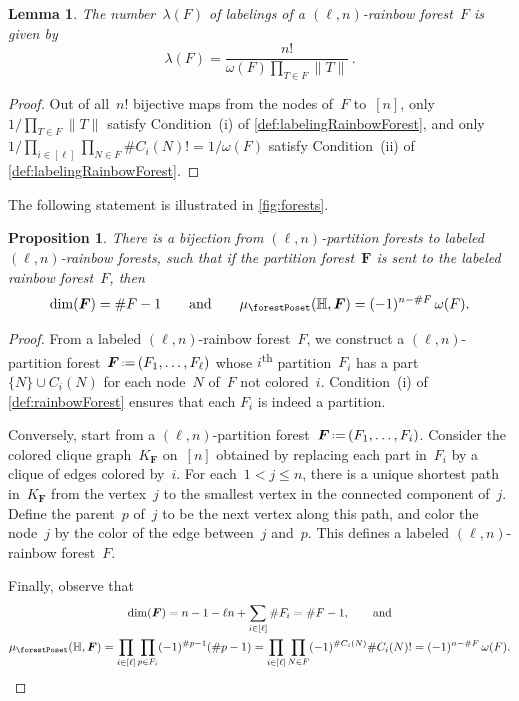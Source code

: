 \documentclass{amsart}
\newtheorem{proposition}[theorem]{Proposition}
\newtheorem{lemma}[theorem]{Lemma}
\theoremstyle{definition}
\renewcommand{\b}[1]{{\boldsymbol{#1}}} %
\newcommand{\eqdef}{\mbox{\,\raisebox{0.2ex}{\scriptsize\ensuremath{\mathrm:}}\ensuremath{=}\,}} %
\newcommand{\ordinal}{\textsuperscript{th}} %
\renewcommand{\b}[1]{\boldsymbol{#1}} %
\newcommand{\HH}{\mathbb{H}} %
\begin{document}
\begin{lemma}
\label{lem:labelingRainbowForest}
The number~$\lambda(F)$ of labelings of a $(\ell,n)$-rainbow forest~$F$ is given by
\[
\lambda(F) = \frac{n!}{\omega(F) \prod\limits_{T \in F} \|T\|} \, .
\]
\end{lemma}

\begin{proof}
Out of all~$n!$ bijective maps from the nodes of~$F$ to~$[n]$, only~$1/\prod_{T \in F} \|T\|$ satisfy Condition~(i) of \cref{def:labelingRainbowForest}, and only $1/\prod_{i \in [\ell]} \prod_{N \in F} \#C_i(N)! = 1/\omega(F)$ satisfy Condition~(ii) of \cref{def:labelingRainbowForest}.
\end{proof}

The following statement is illustrated in \cref{fig:forests}.

\begin{proposition}
\label{prop:bijectionForests}
There is a bijection from $(\ell,n)$-partition forests to labeled $(\ell,n)$-rainbow forests, such that if the partition forest~$\b{F}$ is sent to the labeled rainbow forest~$F$, then
\[
\dim(\b{F}) = \#F-1
\qquad\text{and}\qquad
\mu_{\forestPoset}(\HH, \b{F}) = (-1)^{n-\#F} \, \omega(F).
\]
\end{proposition}

\begin{proof}
From a labeled $(\ell,n)$-rainbow forest~$F$, we construct a $(\ell,n)$-partition forest~$\b{F} \eqdef (F_1, \dots, F_\ell)$ whose $i$\ordinal{} partition~$F_i$ has a part~$\{N\} \cup C_i(N)$ for each node~$N$ of~$F$ not colored~$i$.
Condition~(i) of \cref{def:rainbowForest} ensures that each $F_i$ is indeed a partition.

Conversely, start from a $(\ell,n)$-partition forest~$\b{F} \eqdef (F_1, \dots, F_i)$.
Consider the colored clique graph~$K_{\b{F}}$ on~$[n]$ obtained by replacing each part in~$F_i$ by a clique of edges colored by~$i$.
For each~$1 < j \le n$, there is a unique shortest path in~$K_{\b{F}}$ from the vertex~$j$ to the smallest vertex in the connected component of~$j$.
Define the parent~$p$ of~$j$ to be the next vertex along this path, and color the node~$j$ by the color of the edge between~$j$ and~$p$.
This defines a labeled $(\ell,n)$-rainbow forest~$F$.

Finally, observe that
\begin{gather*}
\dim(\b{F}) = n - 1 - \ell n + \sum_{i \in [\ell]} \#F_i = \#F-1, \qquad\text{and} \\
\mu_{\forestPoset}(\HH, \b{F}) = \prod\limits_{i \in [\ell]} \prod\limits_{p \in F_i} (-1)^{\#p-1} (\#p-1) = \prod\limits_{i \in [\ell]} \prod\limits_{N \in F} (-1)^{\#C_i(N)} \#C_i(N)! = (-1)^{n-\#F} \, \omega(F).
\qedhere
\end{gather*}
\end{proof}
\end{document}
